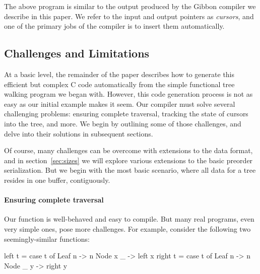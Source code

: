 \documentclass[a4paper,english]{lipics-v2016}
\newcommand{\treelang}{Gibbon\xspace} %
\newif\ifcurly
\begin{document}
The above program is similar to the output produced by the \treelang compiler we
describe in this paper.  We refer to the input and output pointers as {\em
  cursors}, and one of the primary jobs of the compiler is to insert
them automatically.



\subsection{Challenges and Limitations}

At a basic level, the remainder of the paper describes how to generate
this efficient but complex C code automatically from the simple
functional tree walking program we began with.
%
However, this code generation process is not as easy as our initial
example makes it seem. Our compiler must solve several challenging
problems: ensuring complete traversal, tracking the state of cursors
into the tree, and more. We begin by outlining some of those
challenges, and delve into their solutions in subsequent sections.

Of course, many challenges can be overcome with extensions to the data
format, and in section~\ref{sec:sizes} we will explore various
extensions to the basic preorder serialization.  But we begin with the
most basic scenario, where all data for a tree resides in one buffer,
contiguously.


\paragraph*{Ensuring complete traversal} Our  function is
well-behaved and easy to compile. But many real programs, even very
simple ones, pose more challenges. For example, consider the following
two seemingly-similar functions:

\ifcurly
\begin{code}[language=c]
  fun left(t) {
    match(t) {
      Leaf(n):   return n;
      Node(x,_): return left(x);
  }}
  fun right(t) {
    match(t) {
      Leaf(n):   return n;
      Node(_,y): return right(y);
  }}
\end{code}
\else
\begin{code}
  left t = case t of
             Leaf n   -> n
             Node x _ -> left x
  right t = case t of
              Leaf n   -> n
              Node _ y -> right y
\end{code}
\fi
\end{document}

